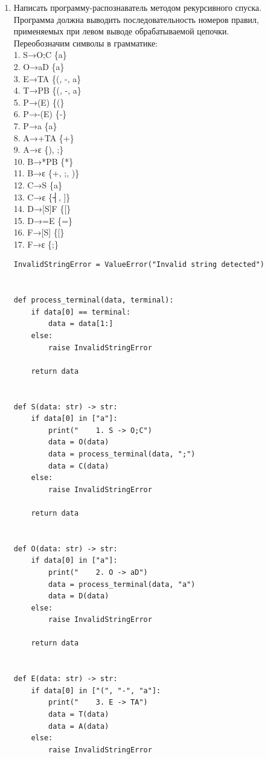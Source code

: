 \documentclass[a4paper,14pt]{extarticle}
\begin{document}
\begin{enumerate}[1.]
    \item Написать программу-распознаватель методом рекурсивного
    спуска. Программа должна выводить последовательность номеров правил, 
    применяемых при левом выводе обрабатываемой цепочки.\\
    Переобозначим символы в грамматике:\\
    1. S→O;C \{a\}\\
    2. O→aD \{a\}\\
    3. E→TA \{(, -, a\}\\
    4. T→PB \{(, -, a\}\\
    5. P→(E) \{(\}\\
    6. P→-(E) \{-\}\\
    7. P→a \{a\}\\
    8. A→+TA \{+\}\\
    9. A→ε \{), ;\}\\
    10. B→*PB \{*\}\\
    11. B→ε \{+, ;, )\}\\
    12. C→S \{a\}\\
    13. C→ε \{┤, ]\}\\
    14. D→[S]F \{[\}\\
    15. D→=E \{=\}\\
    16. F→[S] \{[\}\\
    17. F→ε \{;\}\\
    \begin{verbatim}
InvalidStringError = ValueError("Invalid string detected")


def process_terminal(data, terminal):
    if data[0] == terminal:
        data = data[1:]
    else:
        raise InvalidStringError

    return data


def S(data: str) -> str:
    if data[0] in ["a"]:
        print("    1. S -> O;C")
        data = O(data)
        data = process_terminal(data, ";")
        data = C(data)
    else:
        raise InvalidStringError

    return data


def O(data: str) -> str:
    if data[0] in ["a"]:
        print("    2. O -> aD")
        data = process_terminal(data, "a")
        data = D(data)
    else:
        raise InvalidStringError

    return data


def E(data: str) -> str:
    if data[0] in ["(", "-", "a"]:
        print("    3. E -> TA")
        data = T(data)
        data = A(data)
    else:
        raise InvalidStringError


\end{verbatim}
\end{enumerate}
\end{document}
